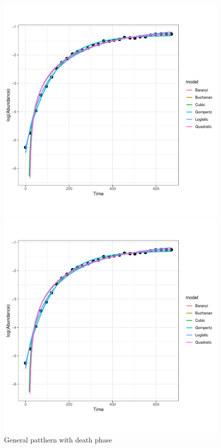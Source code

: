 \documentclass[11pt, oneside]{article}
\begin{document}
		\begin{figure}[H]
			\begin{center}
			\begin{minipage}{.5\textwidth}
				\centering
				\includegraphics[page=4, scale = 0.5]{plot_subsets.pdf}
			\end{minipage}%
			\begin{minipage}{.5\textwidth}
				\centering
				\includegraphics[page=66, scale = 0.5]{plot_subsets.pdf}
			\end{minipage}
			\end{center}
		\caption{General patthern with death phase}
		\end{figure}
		
\end{document}
